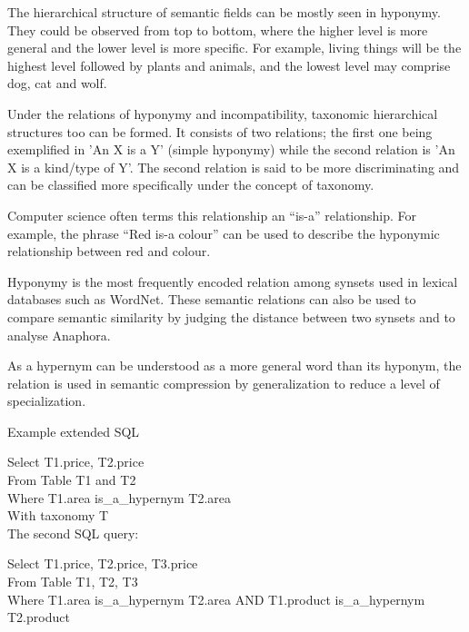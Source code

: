 The hierarchical structure of semantic fields can be mostly seen in hyponymy. They could be observed from top to bottom, where the higher level is more general and the lower level is more specific. For example, living things will be the highest level followed by plants and animals, and the lowest level may comprise dog, cat and wolf.

Under the relations of hyponymy and incompatibility, taxonomic hierarchical structures too can be formed. It consists of two relations; the first one being exemplified in 'An X is a Y' (simple hyponymy) while the second relation is 'An X is a kind/type of Y'. The second relation is said to be more discriminating and can be classified more specifically under the concept of taxonomy.

Computer science often terms this relationship an ``is-a'' relationship. For example, the phrase ``Red is-a colour'' can be used to describe the hyponymic relationship between red and colour.

Hyponymy is the most frequently encoded relation among synsets used in lexical databases such as WordNet. These semantic relations can also be used to compare semantic similarity by judging the distance between two synsets and to analyse Anaphora.

As a hypernym can be understood as a more general word than its hyponym, the relation is used in semantic compression by generalization to reduce a level of specialization.


Example extended SQL

Select  T1.price, T2.price \\
From Table T1 and T2 \\
Where T1.area is\_a\_hypernym T2.area \\
With taxonomy T \\


The second SQL query:

Select  T1.price, T2.price, T3.price \\
From Table T1, T2, T3 \\
Where T1.area is\_a\_hypernym T2.area AND T1.product is\_a\_hypernym T2.product

